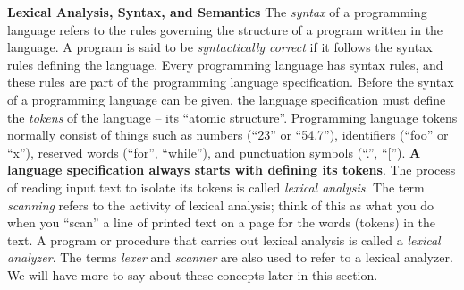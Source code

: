 \begin{minipage}[t]{\sw}
\slidenumber
\LARGE
{\bf Lexical Analysis, Syntax, and Semantics}\exx
The {\em syntax} of a programming language refers
to the rules governing the structure
of a program written in the language.
A program is said to be {\em syntactically correct}
if it follows the syntax rules defining the language.
Every programming language has syntax rules,
and these rules are part of the programming language specification.\exx
Before the syntax of a programming language can be given,
the language specification must define the {\em tokens} of the language --
its ``atomic structure''.
Programming language tokens normally consist
of things such as numbers (``23'' or ``54.7''),
identifiers (``foo'' or ``x''),
reserved words (``for'', ``while''),
and punctuation symbols (``.'', ``['').
{\bf A language specification always starts with defining its tokens}.\exx
The process of reading input text
to isolate its tokens is called {\em lexical analysis}.
The term {\em scanning} refers to the activity of lexical analysis;
think of this as what you do
when you ``scan'' a line of printed text on a page
for the words (tokens) in the text.
A program or procedure that carries out lexical analysis
is called a {\em lexical analyzer}.
The terms {\em lexer} and {\em scanner}
are also used to refer to a lexical analyzer.
We will have more to say about these concepts later in this section.\exx
\end{minipage}
